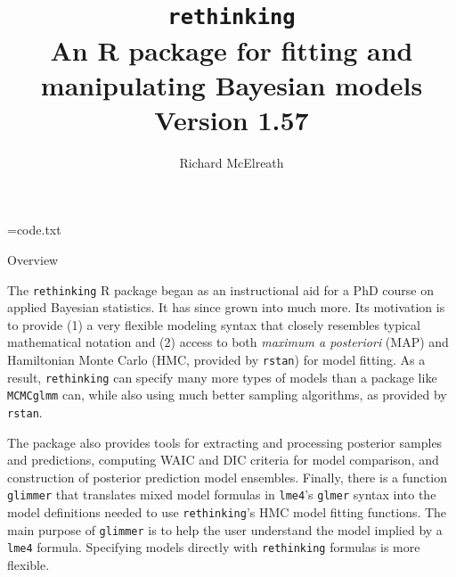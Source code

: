 \documentclass[11pt,reqno]{amsart}
\makeatletter
\renewcommand\section{\@startsection{section}{1}
\z@{.7\linespacing\@plus\linespacing}{.5\linespacing}
{\large\bfseries\centering\color{myblue}}}
\newcommand{\ttx}[1]{\texttt{#1}}
\makeatother
\begin{document}
\immediate\openout\tempfile=code.txt

\cleardoublepage
\thispagestyle{empty}

\title[rethinking version 1.57]{\texttt{\Large rethinking}\\An \textsf{\large R} package for fitting and manipulating Bayesian models\\Version 1.57}
\author{Richard McElreath}
\maketitle



\setcounter{tocdepth}{2}
{%
\tableofcontents
}

\section{Overview}

The \texttt{rethinking} \textsf{R} package began as an instructional aid for a PhD course on applied Bayesian statistics. It has since grown into much more. Its motivation is to provide (1)  a very flexible modeling syntax that closely resembles typical mathematical notation and (2) access to both \emph{maximum a posteriori} (MAP) and Hamiltonian Monte Carlo (HMC, provided by \texttt{rstan}) for model fitting. As a result, \texttt{rethinking} can specify many more types of models than a package like \texttt{MCMCglmm} can, while also using much better sampling algorithms, as provided by \texttt{rstan}.


The package also provides tools for extracting and processing posterior samples and predictions, computing WAIC and DIC criteria for model comparison, and construction of posterior prediction model ensembles. Finally, there is a function \texttt{glimmer} that translates mixed model formulas in \texttt{lme4}'s \texttt{glmer} syntax into the model definitions needed to use \texttt{rethinking}'s HMC model fitting functions. The main purpose of \ttx{glimmer} is to help the user understand the model implied by a \ttx{lme4} formula. Specifying models directly with \ttx{rethinking} formulas is more flexible.
\end{document}

